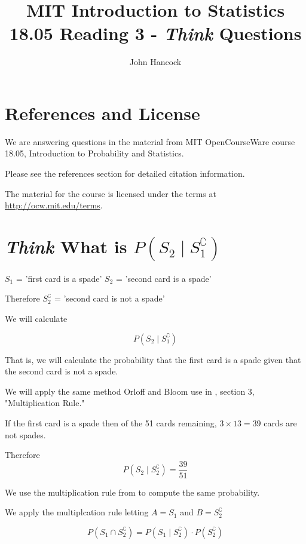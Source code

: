\documentclass[a4paper,11pt]{article}
\author{John Hancock}
\title{MIT Introduction to Statistics 18.05 Reading 3 - 
\textit{Think} Questions }
\begin{document}
\maketitle
\tableofcontents
\section{References and License}
We are answering questions in the material from MIT OpenCourseWare
course 18.05, Introduction to Probability and Statistics.

Please see the references section for detailed citation information.

The material for the course is licensed under the terms at 
\url{http://ocw.mit.edu/terms}.

\section{\textit{Think} What is $P\left(S_{2} \mid S_{1}^{\complement}\right)$}

$S_{1}$ = 'first card is a spade'
$S_{2}$ = 'second card is a spade'

Therefore $S_{2}^{\complement}$  = 'second card is not a spade'

We will calculate

\begin{equation}
  P\left(S_{2} \mid S_{1}^{\complement}\right)
\end{equation}

That is, we will calculate the probability that the first card is a
spade given that the second card is not a spade.

We will apply the same method Orloff and Bloom use in \cite{reading3}, 
section 3, "Multiplication Rule."

If the first card is a spade then of the 51 cards remaining, 
$3 \times 13 = 39$ cards are not spades.

Therefore 
\begin{equation} \label{s1S2Condish}
  P\left(S_{2} \mid S_{2}^{\complement}\right) = \frac{39}{51}
\end{equation}

We use the multiplication rule from \cite{reading3} 
to compute the same probability.

We apply the multiplcation rule letting $A=S_{1}$ and $B=S_{2}^{\complement}$

\begin{equation} \label{multRule}
  P\left(S_{1} \cap S_{2}^{\complement}\right) =
  P\left(S_{1} \mid S_{2}^{\complement}\right) \cdot 
  P\left(S_{2}^{\complement}\right)
\end{equation}
\end{document}
